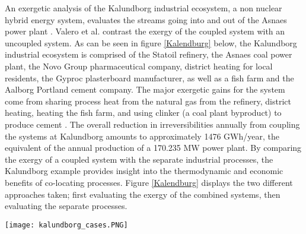  An exergetic analysis of the Kalundborg industrial ecosystem, a non nuclear hybrid energy system, evaluates the streams going into and out of the Asnaes power plant \cite{Valero2012}.  Valero et al. contrast the exergy of the coupled system with an uncoupled system. As can be seen in figure \ref{Kalendburg} below, the Kalundborg industrial ecosystem is comprised of the Statoil refinery, the Asnaes coal power plant, the Novo Group pharmaceutical company, district heating for local residents, the Gyproc plasterboard manufacturer, as well as a fish farm and the Aalborg Portland cement company. The major exergetic gains for the system come from sharing process heat from the natural gas from the refinery, district heating, heating the fish farm, and using clinker (a coal plant byproduct) to produce cement \cite{Valero2012}. The overall reduction in irreversibilities annually from coupling the systems at Kalundborg amounts to approximately 1476 GWh/year, the equivalent of the annual production of a 170.235 MW power plant. By comparing the exergy of a coupled system with the separate industrial processes, the Kalundborg example provides insight into the thermodynamic and economic benefits of co-locating processes. Figure \ref{Kalendburg} displays the two different approaches taken; first evaluating the exergy of the combined systems, then evaluating the separate processes.

\begin{figure*}
\centering
\label{Kalendburg}
\texttt{[image: kalundborg\_cases.PNG]}
\caption{\small \sl This figure displays the two cases evaluated in Valero et al. Figure a shows the industrial ecosystem in the current coupled form. Figure b shows the second case where there is no coupling.}
\end{figure*}


